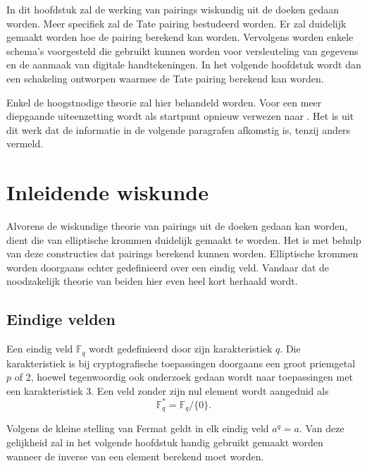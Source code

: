 
In dit hoofdstuk zal de werking van pairings wiskundig uit de doeken gedaan worden. Meer specifiek zal de Tate pairing bestudeerd worden. Er zal duidelijk gemaakt worden hoe de pairing berekend kan worden. Vervolgens worden enkele schema's voorgesteld die gebruikt kunnen worden voor versleuteling van gegevens en de aanmaak van digitale handtekeningen. In het volgende hoofdstuk wordt dan een schakeling ontworpen waarmee de Tate pairing berekend kan worden.

Enkel de hoogstnodige theorie zal hier behandeld worden. Voor een meer diepgaande uiteenzetting wordt als startpunt opnieuw verwezen naar \cite{maas}. Het is uit dit werk dat de informatie in de volgende paragrafen afkomstig is, tenzij anders vermeld.

\section{Inleidende wiskunde}

Alvorens de wiskundige theorie van pairings uit de doeken gedaan kan worden, dient die van elliptische krommen duidelijk gemaakt te worden. Het is met behulp van deze constructies dat pairings berekend kunnen worden. Elliptische krommen worden doorgaans echter gedefinieerd over een eindig veld. Vandaar dat de noodzakelijk theorie van beiden hier even heel kort herhaald wordt.

\subsection{Eindige velden}

Een eindig veld $\mathbb{F}_q$ wordt gedefinieerd door zijn karakteristiek $q$. Die karakteristiek is bij cryptografische toepassingen doorgaans een groot priemgetal $p$ of 2, hoewel tegenwoordig ook onderzoek gedaan wordt naar toepassingen met een karakteristiek 3. Een veld zonder zijn nul element wordt aangeduid als
\[\mathbb{F}_q^* = \mathbb{F}_q / \{ 0 \}.\]

Volgens de kleine stelling van Fermat geldt in elk eindig veld $a^q = a$. Van deze gelijkheid zal in het volgende hoofdstuk handig gebruikt gemaakt worden wanneer de inverse van een element berekend moet worden.


